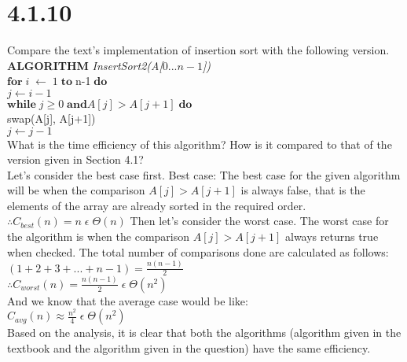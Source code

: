 \documentclass[8pt, letterpaper]{article}
\begin{document}
\section{4.1.10}
Compare the text’s implementation of insertion sort with the following version.
\textbf{ALGORITHM} \textit{InsertSort2(A[$0...n-1$])} \\
\indent $\textbf{for}\; i \; \leftarrow \; 1 \; \textbf{to} \; $n-1$ \; \textbf{do}$ \\
\indent \indent $j \leftarrow i-1$ \\
\indent $\textbf{while} \; j \ge 0 \; \textbf{and} A[j] > A[j+1] \; \textbf{do}$ \\
\indent \indent swap(A[j], A[j+1]) \\
\indent \indent \textit{$j \leftarrow j-1$} \\
What is the time efficiency of this algorithm? How is it compared to that of the version given in Section 4.1? \\
Let's consider the best case first.
Best case: The best case for the given algorithm will be when the comparison $A[j] > A[j+1]$ is always false, that is the elements of the array are already sorted in the required order. \\
\indent $\mathrel{\therefore{}} C_{best}(n) = n \; \epsilon \; \Theta(n)$
Then let's consider the worst case. The worst case for the algorithm is when the comparison $A[j] > A[j+1]$ always returns true when checked. The total number of comparisons done are calculated as follows: \\
$(1 + 2 + 3 + ... + n - 1) = \frac{n(n-1)}{2}$ \\
\indent $\mathrel{\therefore{}} C_{worst}(n) = \frac{n(n-1)}{2} \; \epsilon \; \Theta(n^2)$ \\
And we know that the average case would be like: \\
\indent $C_{avg}(n) \approx \frac{n^2}{4} \; \epsilon \; \Theta(n^2)$ \\
Based on the analysis, it is clear that both the algorithms (algorithm given in the textbook and the algorithm given in the question) have the same efficiency.
\end{document}
